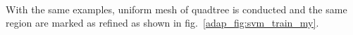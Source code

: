 \paragraph{}
With the same examples, uniform mesh of quadtree is conducted and the same region are marked as refined as shown in fig.~\ref{adap_fig:svm_train_my}.
\begin{figure}[!ht]
    \centering
    \begin{subfigure}[b]{1\linewidth}
        \centering
    \end{subfigure}
    \begin{subfigure}[b]{0.49\linewidth}
\end{subfigure}
\end{figure}
